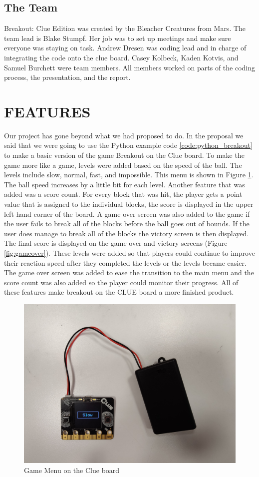 \documentclass[12pt]{article}
\begin{document}
\subsection{The Team}

Breakout: Clue Edition was created by the Bleacher Creatures from Mars. The team lead is Blake Stumpf. Her job was to set up meetings and make sure everyone was staying on task. Andrew Dresen was coding lead and in charge of integrating the code onto the clue board. Casey Kolbeck, Kaden Kotvis, and Samuel Burchett were team members. All members worked on parts of the coding process, the presentation, and the report.


\section{FEATURES}
Our project has gone beyond what we had proposed to do. In the proposal we said that we were going to use the Python example code \ref{code:python_breakout} to make a basic version of the game Breakout on the Clue board. To make the game more like a game, levels were added based on the speed of the ball. The levels include slow, normal, fast, and impossible. This menu is shown in Figure \ref{fig:menu}. The ball speed increases by a little bit for each level. Another feature that was added was a score count. For every block that was hit, the player gets a point value that is assigned to the individual blocks, the score is displayed in the upper left hand corner of the board. A game over screen was also added to the game if the user fails to break all of the blocks before the ball goes out of bounds. If the user does manage to break all of the blocks the victory screen is then displayed. The final score is displayed on the game over and victory screens (Figure \ref{fig:gameover}). These levels were added so that players could continue to improve their reaction speed after they completed the levels or the levels became easier. The game over screen was added to ease the transition to the main menu and the score count was also added so the player could monitor their progress. All of these features make breakout on the CLUE board a more finished product. 

\begin{figure}[!t]
\centering
\includegraphics[width=4.5in]{images/Clue_Board_Menu.jpg}
\caption{Game Menu on the Clue board}
\label{fig:menu}
\end{figure}
\end{document}
